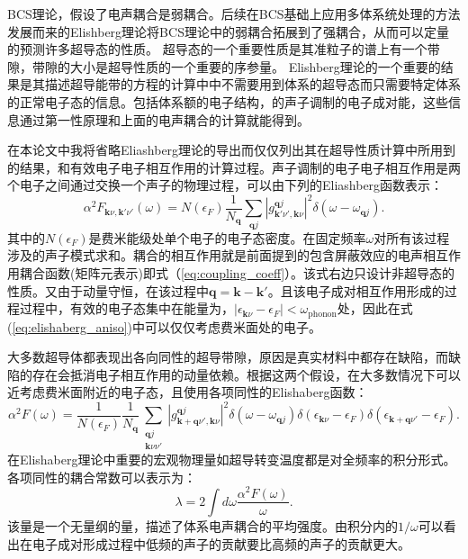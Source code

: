 BCS理论，假设了电声耦合是弱耦合。后续在BCS基础上应用多体系统处理的方法\cite{scalapino1969electron}发展而来的Elishberg理论\cite{eliashberg1960interactions}将BCS理论中的弱耦合拓展到了强耦合，从而可以定量的预测许多超导态的性质。
超导态的一个重要性质是其准粒子的谱上有一个带隙，带隙的大小是超导性质的一个重要的序参量。
Elishberg理论的一个重要的结果是其描述超导能带的方程的计算中中不需要用到体系的超导态而只需要特定体系的正常电子态的信息。包括体系额的电子结构，的声子调制的电子成对能，这些信息通过第一性原理和上面的电声耦合的计算就能得到。

在本论文中我将省略Eliashberg理论的导出而仅仅列出其在超导性质计算中所用到的结果，和有效电子电子相互作用的计算过程。声子调制的电子电子相互作用是两个电子之间通过交换一个声子的物理过程，可以由下列的Eliashberg函数表示：
\begin{equation}\label{eq:elishaberg_aniso}
  \alpha^2 F_{\bm{k}\nu,\bm{k}'\nu'}(\omega) =
  N(\epsilon_F) \frac{1}{N_{\bm{q}}} \sum_{\bm{q}j}
  |g^{\bm{q}j}_{\bm{k}'\nu',\bm{k}\nu}|^2 \delta(\omega-\omega_{\bm{q}j}).
\end{equation}
其中的$N(\epsilon_F)$是费米能级处单个电子的电子态密度。在固定频率$\omega$对所有该过程涉及的声子模式求和。耦合的相互作用就是前面提到的包含屏蔽效应的电声相互作用耦合函数(矩阵元表示)即式（\ref{eq:coupling_coeff}）。该式右边只设计非超导态的性质。又由于动量守恒，在该过程中$\bm{q}=\bm{k}-\bm{k}'$。且该电子成对相互作用形成的过程过程中，有效的电子态集中在能量为，$|\epsilon_{\bm{k}\nu}-\epsilon_F|<\omega_{\mathrm{phonon}}$处，因此在式(\ref{eq:elishaberg_aniso})中可以仅仅考虑费米面处的电子\cite{allen1983theory}。

大多数超导体都表现出各向同性的超导带隙，原因是真实材料中都存在缺陷，而缺陷的存在会抵消电子相互作用的动量依赖。根据这两个假设，在大多数情况下可以近考虑费米面附近的电子态，且使用各项同性的Elishaberg函数：
\begin{equation}\label{eq:elishaberg_iso}
  \alpha^2 F(\omega) = \frac{1}{N(\epsilon_F)}\frac{1}{N_{\bm{q}}}
  \sum_{\substack{\bm{q}j \\ \bm{k}\nu\nu'}} |g^{\bm{q}j}_{\bm{k}+\bm{q}\nu',\bm{k}\nu}|^2
  \delta(\omega-\omega_{\bm{q}j})
  \delta(\epsilon_{\bm{k}\nu}-\epsilon_{F})
  \delta(\epsilon_{\bm{k}+\bm{q}\nu'}-\epsilon_F).
\end{equation}
在Elishaberg理论中重要的宏观物理量如超导转变温度都是对全频率的积分形式。各项同性的耦合常数可以表示为：
\begin{equation}\label{eq:lambda_coupling}
  \lambda = 2 \int d\omega \frac{\alpha^2 F(\omega)}{\omega}.
\end{equation}
该量是一个无量纲的量，描述了体系电声耦合的平均强度。由积分内的$1/\omega$可以看出在电子成对形成过程中低频的声子的贡献要比高频的声子的贡献更大。


